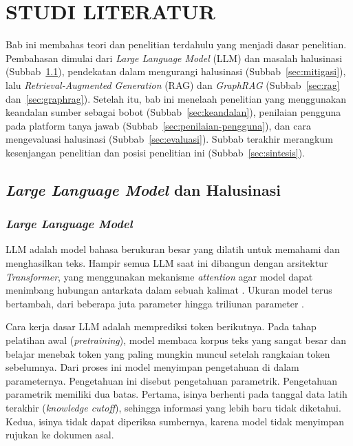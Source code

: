 \cleardoublepage
\chapter{STUDI LITERATUR}
\label{chap:studi-literatur}

Bab ini membahas teori dan penelitian terdahulu yang menjadi dasar penelitian. Pembahasan dimulai dari \emph{Large Language Model} (LLM) dan masalah halusinasi (Subbab~\ref{sec:llm-halusinasi}), pendekatan dalam mengurangi halusinasi (Subbab~\ref{sec:mitigasi}), lalu \emph{Retrieval-Augmented Generation} (RAG) dan \emph{GraphRAG} (Subbab~\ref{sec:rag} dan~\ref{sec:graphrag}). Setelah itu, bab ini menelaah penelitian yang menggunakan keandalan sumber sebagai bobot (Subbab~\ref{sec:keandalan}), penilaian pengguna pada platform tanya jawab (Subbab~\ref{sec:penilaian-pengguna}), dan cara mengevaluasi halusinasi (Subbab~\ref{sec:evaluasi}). Subbab terakhir merangkum kesenjangan penelitian dan posisi penelitian ini (Subbab~\ref{sec:sintesis}).

\section{\emph{Large Language Model} dan Halusinasi}
\label{sec:llm-halusinasi}

\subsection{\emph{Large Language Model}}
\label{sec:llm}

LLM adalah model bahasa berukuran besar yang dilatih untuk memahami dan menghasilkan teks. Hampir semua LLM saat ini dibangun dengan arsitektur \emph{Transformer}, yang menggunakan mekanisme \emph{attention} agar model dapat menimbang hubungan antarkata dalam sebuah kalimat \autocite{Vaswani2017}. Ukuran model terus bertambah, dari beberapa juta parameter hingga triliunan parameter \autocite{Patil2024}.

Cara kerja dasar LLM adalah memprediksi token berikutnya. Pada tahap pelatihan awal (\emph{pretraining}), model membaca korpus teks yang sangat besar dan belajar menebak token yang paling mungkin muncul setelah rangkaian token sebelumnya. Dari proses ini model menyimpan pengetahuan di dalam parameternya. Pengetahuan ini disebut pengetahuan parametrik. Pengetahuan parametrik memiliki dua batas. Pertama, isinya berhenti pada tanggal data latih terakhir (\emph{knowledge cutoff}), sehingga informasi yang lebih baru tidak diketahui. Kedua, isinya tidak dapat diperiksa sumbernya, karena model tidak menyimpan rujukan ke dokumen asal.

